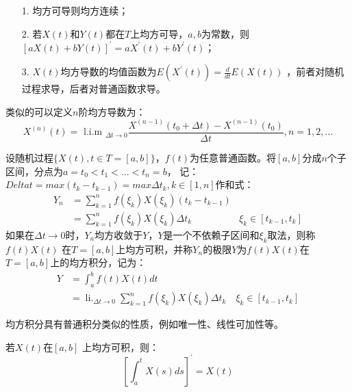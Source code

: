 \documentclass[lang=cn,newtx,10pt,scheme=chinese]{elegantbook}
\begin{document}
\begin{property}
  \begin{itemize}
    \item[1.]  均方可导则均方连续；
    \item[2.]  若$X(t)$和$Y(t)$都在$T$上均方可导，$a, b$为常数，则$[a X(t)+b Y(t)]^{\prime}=a X^{\prime}(t)+b Y^{\prime}(t)$；
    \item[3.]  $X(t)$均方导数的均值函数为$E(X^{\prime}(t))=\frac{d}{dt}E(X(t))$ ，前者对随机过程求导，后者对普通函数求导。
  \end{itemize}
\end{property}
类似的可以定义$n$阶均方导数为：
\begin{equation}
  X^{(n)}(t)=\text { l.i.m }_{\Delta t \rightarrow 0} \frac{X^{(n-1)}\left(t_0+\Delta t\right)-X^{(n-1)}\left(t_0\right)}{\Delta t}, n=1,2, \ldots
  \end{equation}

\begin{definition}
  设随机过程$\{X(t), t \in T =[a, b] \}$，$f(t)$为任意普通函数。将$[a, b]$分成$n$个子区间，分点为$a=t_0 < t_1 < ... < t_n = b$，
  记：
  $Delta t = max(t_k - t_{k-1}) = max \Delta t_k, k \in [1, n]$作和式：
  \begin{equation}
    \begin{array}{rlr}
    Y_n & =\sum_{k=1}^n f\left(\xi_k\right) X\left(\xi_k\right)\left(t_k-t_{k-1}\right) & \\
    & =\sum_{k=1}^n f\left(\xi_k\right) X\left(\xi_k\right) \Delta t_k & \xi_k \in\left[t_{k-1}, t_k\right]
    \end{array}
  \end{equation}
如果在$\Delta t \rightarrow 0$时，$Y_n$均方收敛于$Y$，$Y$是一个不依赖子区间和$\xi_k$取法，则称$f(t)X(t)$
在$T=[a, b]$上均方可积，并称$Y_n$的极限$Y$为$f(t)X(t)$在$T=[a, b]$上的均方积分，记为：
\begin{equation}
  \begin{aligned}
  Y & =\int_a^b f(t) X(t) d t \\
  & =\operatorname{li.}_{\Delta t \rightarrow 0} \sum_{k=1}^n f\left(\xi_k\right) X\left(\xi_k\right) \Delta t_k \quad \xi_k \in\left[t_{k-1}, t_k\right]
  \end{aligned}
  \end{equation}
\end{definition}
均方积分具有普通积分类似的性质，例如唯一性、线性可加性等。

\begin{theorem}
  若$X(t)$在$[a, b]$ 上均方可积，则：
  \begin{equation}
    \left[\int_a^t X(s) d s\right]^{\prime}=X(t)
  \end{equation}
\end{theorem}
\end{document}
